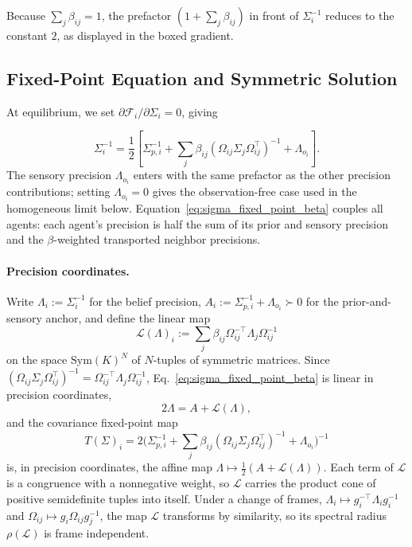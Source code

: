 \documentclass[11pt]{article}
\begin{document}
Because $\sum_j \beta_{ij} = 1$, the prefactor $(1 + \sum_j \beta_{ij})$ in front of $\Sigma_i^{-1}$ reduces to the constant $2$, as displayed in the boxed gradient.

\subsection{Fixed-Point Equation and Symmetric Solution}

At equilibrium, we set $\partial \mathcal{F}_i / \partial \Sigma_i = 0$, giving

\begin{equation}
\Sigma_i^{-1}
=\frac{1}{2}
\left[
\Sigma_{p,i}^{-1}
+ \sum_j \beta_{ij}
(\Omega_{ij}\Sigma_j\Omega_{ij}^\top)^{-1}
+ \Lambda_{o_i}
\right].
\label{eq:sigma_fixed_point_beta}
\end{equation}
The sensory precision $\Lambda_{o_i}$ enters with the same prefactor as the other precision contributions; setting $\Lambda_{o_i} = 0$ gives the observation-free case used in the homogeneous limit below. Equation~\eqref{eq:sigma_fixed_point_beta} couples all agents: each agent's precision is half the sum of its prior and sensory precision and the $\beta$-weighted transported neighbor precisions.

\paragraph{Precision coordinates.} Write $\Lambda_i := \Sigma_i^{-1}$ for the belief precision, $A_i := \Sigma_{p,i}^{-1} + \Lambda_{o_i} \succ 0$ for the prior-and-sensory anchor, and define the linear map
\begin{equation}
\mathcal{L}(\Lambda)_i := \sum_j \beta_{ij}\Omega_{ij}^{-\top}\Lambda_j\Omega_{ij}^{-1}
\label{eq:precision_transport_map}
\end{equation}
on the space $\mathrm{Sym}(K)^N$ of $N$-tuples of symmetric matrices. Since $(\Omega_{ij}\Sigma_j\Omega_{ij}^\top)^{-1} = \Omega_{ij}^{-\top}\Lambda_j\Omega_{ij}^{-1}$, Eq.~\eqref{eq:sigma_fixed_point_beta} is linear in precision coordinates,
\begin{equation}
2\Lambda = A + \mathcal{L}(\Lambda),
\label{eq:precision_linear}
\end{equation}
and the covariance fixed-point map
\begin{equation}
T(\Sigma)_i = 2\big(\Sigma_{p,i}^{-1} + \sum_j \beta_{ij}(\Omega_{ij}\Sigma_j\Omega_{ij}^\top)^{-1} + \Lambda_{o_i}\big)^{-1}
\label{eq:sigma_fixed_point_map}
\end{equation}
is, in precision coordinates, the affine map $\Lambda \mapsto \tfrac{1}{2}(A + \mathcal{L}(\Lambda))$. Each term of $\mathcal{L}$ is a congruence with a nonnegative weight, so $\mathcal{L}$ carries the product cone of positive semidefinite tuples into itself. Under a change of frames, $\Lambda_i \mapsto g_i^{-\top}\Lambda_i g_i^{-1}$ and $\Omega_{ij} \mapsto g_i\Omega_{ij}g_j^{-1}$, the map $\mathcal{L}$ transforms by similarity, so its spectral radius $\rho(\mathcal{L})$ is frame independent.
\end{document}
